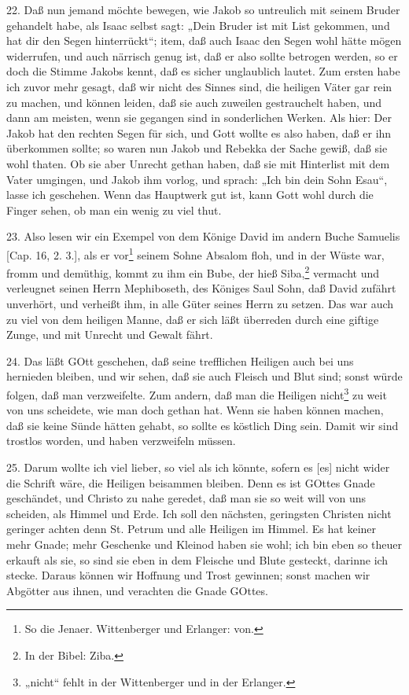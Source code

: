 22. Daß nun jemand möchte bewegen, wie Jakob so untreulich mit seinem Bruder gehandelt habe, als Isaac selbst sagt: „Dein Bruder ist mit List gekommen, und hat dir den Segen hinterrückt“; item, daß auch Isaac den Segen wohl hätte mögen widerrufen, und auch närrisch genug ist, daß er also sollte betrogen werden, so er doch die Stimme Jakobs kennt, daß es sicher unglaublich lautet. Zum ersten habe ich zuvor mehr gesagt, daß wir nicht des Sinnes sind, die heiligen Väter gar rein zu machen, und können leiden, daß sie auch zuweilen gestrauchelt haben, und dann am meisten, wenn sie gegangen sind in sonderlichen Werken. Als hier: Der Jakob hat den rechten Segen für sich, und Gott wollte es also haben, daß er ihn überkommen sollte; so waren nun Jakob und Rebekka der Sache gewiß, daß sie wohl thaten. Ob sie aber Unrecht gethan haben, daß sie mit Hinterlist mit dem Vater umgingen, und Jakob ihm vorlog, und sprach: „Ich bin dein Sohn Esau“, lasse ich geschehen. Wenn das Hauptwerk gut ist, kann Gott wohl durch die Finger sehen, ob man ein wenig zu viel thut.

23. Also lesen wir ein Exempel von dem Könige David im andern Buche Samuelis [Cap. 16, 2. 3.], als er vor\footnote{So die Jenaer. Wittenberger und Erlanger: von.} seinem Sohne Absalom floh, und in der Wüste war, fromm und demüthig, kommt zu ihm ein Bube, der hieß Siba,\footnote{In der Bibel: Ziba.} vermacht und verleugnet seinen Herrn Mephiboseth, des Königes Saul Sohn, daß David zufährt unverhört, und verheißt ihm, in alle Güter seines Herrn zu setzen. Das war auch zu viel von dem heiligen Manne, daß er sich läßt überreden durch eine giftige Zunge, und mit Unrecht und Gewalt fährt.

24. Das läßt GOtt geschehen, daß seine trefflichen Heiligen auch bei uns hernieden bleiben, und wir sehen, daß sie auch Fleisch und Blut sind; sonst würde folgen, daß man verzweifelte. Zum andern, daß man die Heiligen nicht\footnote{„nicht“ fehlt in der Wittenberger und in der Erlanger.} zu weit von uns scheidete, wie man doch gethan hat. Wenn sie haben können machen, daß sie keine Sünde hätten gehabt, so sollte es köstlich Ding sein. Damit wir sind trostlos worden, und haben verzweifeln müssen.

25. Darum wollte ich viel lieber, so viel als ich könnte, sofern es [es] nicht wider die Schrift wäre, die Heiligen beisammen bleiben. Denn es ist GOttes Gnade geschändet, und Christo zu nahe geredet, daß man sie so weit will von uns scheiden, als Himmel und Erde. Ich soll den nächsten, geringsten Christen nicht geringer achten denn St. Petrum und alle Heiligen im Himmel. Es hat keiner mehr Gnade; mehr Geschenke und Kleinod haben sie wohl; ich bin eben so theuer erkauft als sie, so sind sie eben in dem Fleische und Blute gesteckt, darinne ich stecke. Daraus können wir Hoffnung und Trost gewinnen; sonst machen wir Abgötter aus ihnen, und verachten die Gnade GOttes.

